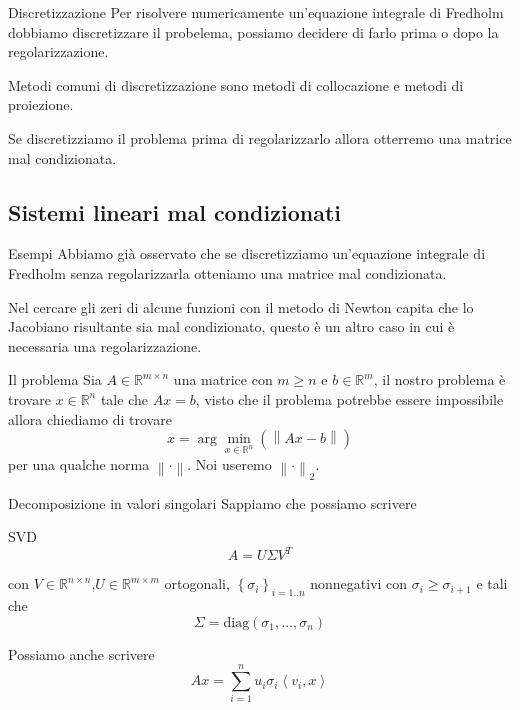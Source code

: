 \documentclass{beamer}
\theoremstyle{plain}
\theoremstyle{definition}
\theoremstyle{remark}
\newcommand{\set}[1]{\left\{#1\right\}}
\newcommand{\pa}[1]{\left(#1\right)}
\newcommand{\ang}[1]{\left<#1\right>}
\newcommand{\norm}[1]{\left\|#1\right\|}
\begin{document}
\begin{frame}{Discretizzazione}
  Per risolvere numericamente un'equazione integrale di Fredholm
  dobbiamo discretizzare il probelema, possiamo decidere di farlo
  prima o dopo la regolarizzazione.
  \vfill
  
  Metodi comuni di discretizzazione sono metodi di collocazione e
  metodi di proiezione.
  \vfill
  
  Se discretizziamo il problema prima di regolarizzarlo allora
  otterremo una matrice mal condizionata.
\end{frame}



\subsection{Sistemi lineari mal condizionati}

\begin{frame}{Esempi}
  Abbiamo già osservato che se discretizziamo un'equazione integrale di
  Fredholm senza regolarizzarla otteniamo una matrice mal
  condizionata.
  \vfill
  
  Nel cercare gli zeri di alcune funzioni con il metodo di Newton
  capita che lo Jacobiano risultante sia mal condizionato, questo è un
  altro caso in cui è necessaria una regolarizzazione.
\end{frame}

\begin{frame}{Il problema}
  Sia $A\in \mathbb{R}^{m \times n}$ una matrice con $m \ge n$ e $b
  \in \mathbb{R}^m$, il nostro problema è trovare $x \in \mathbb{R}^n$
  tale che $Ax = b$, visto che il problema potrebbe essere impossibile
  allora chiediamo di trovare
  \[ x = \arg\min _{x\in \mathbb{R}^n} \pa{ \norm{Ax -b} } \]
  per una qualche norma $\norm{\cdot}$. Noi useremo $\norm{\cdot}_2$.
\end{frame}

\begin{frame}{Decomposizione in valori singolari}
  Sappiamo che possiamo scrivere
  \begin{block}{SVD}
    \[ A = U\Sigma V^T \] 
  \end{block}
  con $V\in \mathbb{R}^{n\times n}$,$U\in \mathbb{R}^{m\times m}$
  ortogonali, $\set{\sigma _i}_{i=1..n}$ nonnegativi con $\sigma _i
  \ge \sigma _{i+1}$ e tali che
  \[ \Sigma = \mathrm{diag} \pa{ \sigma_1,...,\sigma _n} \]
  
  Possiamo anche scrivere
  \[ Ax = \sum _{i=1} ^n u_i \sigma _i \ang{v_i,x} \]
\end{frame}
\end{document}
